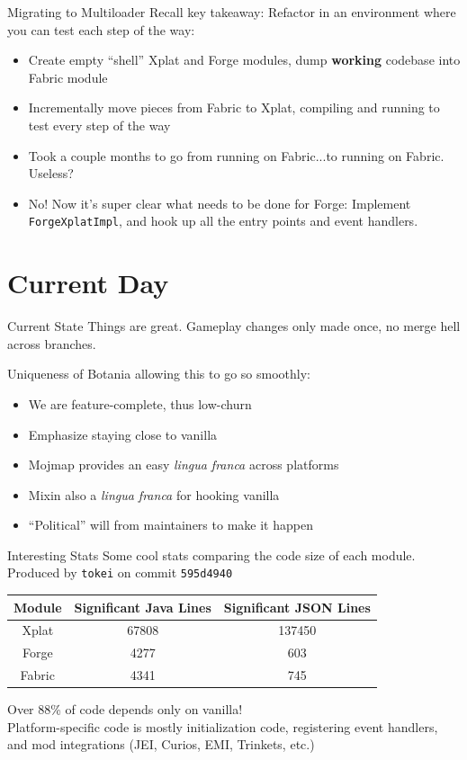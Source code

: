 \documentclass{beamer}
\begin{document}
\begin{frame}{Migrating to Multiloader}
  Recall key takeaway: Refactor in an environment where you can test each step of the way:
  \begin{itemize}
  \item Create empty ``shell'' Xplat and Forge modules, dump \textbf{working} codebase into Fabric module
  \item Incrementally move pieces from Fabric to Xplat, compiling and running to test every step of the way
  \item Took a couple months to go from running on Fabric...to running on Fabric. Useless?
  \item No! Now it's super clear what needs to be done for Forge: Implement \texttt{ForgeXplatImpl}, and hook up all the entry points and event handlers.
  \end{itemize}
  
\end{frame}

\section{Current Day}
\begin{frame}{Current State}
  Things are great. Gameplay changes only made once, no merge hell across branches.

  Uniqueness of Botania allowing this to go so smoothly:
  \begin{itemize}
  \item We are feature-complete, thus low-churn
  \item Emphasize staying close to vanilla
  \item Mojmap provides an easy \textit{lingua franca} across platforms
  \item Mixin also a \textit{lingua franca} for hooking vanilla
  \item ``Political'' will from maintainers to make it happen
  \end{itemize}
\end{frame}

\begin{frame}{Interesting Stats}
  Some cool stats comparing the code size of each module.
  Produced by \texttt{tokei} on commit \texttt{595d4940}

  
  \begin{tabular}{|c||c|c|}
    \hline
    Module & Significant Java Lines & Significant JSON Lines \\
    \hline\hline
    Xplat  & 67808 & 137450 \\
    \hline
    Forge  & 4277  & 603 \\
    \hline
    Fabric & 4341  & 745 \\
    \hline
  \end{tabular}

  Over 88\% of code depends only on vanilla!\\
  Platform-specific code is mostly initialization code, registering event handlers,
  and mod integrations (JEI, Curios, EMI, Trinkets, etc.)
\end{frame}
\end{document}
